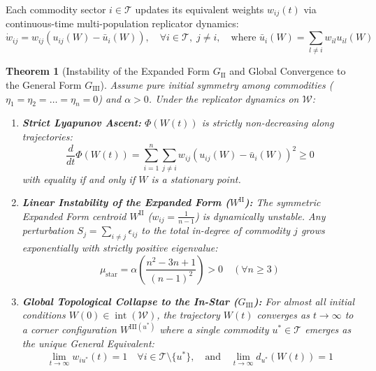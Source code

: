 \documentclass[11pt,a4paper]{article}
\newtheorem{theorem}{Theorem}[section]
\begin{document}
Each commodity sector $i \in \mathcal{T}$ updates its equivalent weights $w_{ij}(t)$ via continuous-time multi-population replicator dynamics:
\begin{equation}
    \dot{w}_{ij} = w_{ij} \left( u_{ij}(W) - \bar{u}_i(W) \right), \quad \forall i \in \mathcal{T}, \; j \neq i, \quad \text{where } \bar{u}_i(W) = \sum_{l \neq i} w_{il} u_{il}(W)
\end{equation}

\begin{theorem}[Instability of the Expanded Form $G_{\text{II}}$ and Global Convergence to the General Form $G_{\text{III}}$]
Assume pure initial symmetry among commodities ($\eta_1 = \eta_2 = \dots = \eta_n = 0$) and $\alpha > 0$. Under the replicator dynamics on $\mathcal{W}$:
\begin{enumerate}[label=(\arabic*)]
    \item \textbf{Strict Lyapunov Ascent:} $\Phi(W(t))$ is strictly non-decreasing along trajectories:
    \begin{equation}
        \frac{d}{dt} \Phi(W(t)) = \sum_{i=1}^n \sum_{j \neq i} w_{ij} \left(u_{ij}(W) - \bar{u}_i(W)\right)^2 \ge 0
    \end{equation}
    with equality if and only if $W$ is a stationary point.
    \item \textbf{Linear Instability of the Expanded Form ($W^{\text{II}}$):} The symmetric Expanded Form centroid $W^{\text{II}}$ ($w_{ij} = \frac{1}{n-1}$) is dynamically unstable. Any perturbation $S_j = \sum_{i \neq j} \epsilon_{ij}$ to the total in-degree of commodity $j$ grows exponentially with strictly positive eigenvalue:
    \begin{equation}
        \mu_{\text{star}} = \alpha \left( \frac{n^2 - 3n + 1}{(n-1)^2} \right) > 0 \quad (\forall n \ge 3)
    \end{equation}
    \item \textbf{Global Topological Collapse to the In-Star ($G_{\text{III}}$):} For almost all initial conditions $W(0) \in \operatorname{int}(\mathcal{W})$, the trajectory $W(t)$ converges as $t \to \infty$ to a corner configuration $W^{\text{III}(u^*)}$ where a single commodity $u^* \in \mathcal{T}$ emerges as the unique General Equivalent:
    \begin{equation}
        \lim_{t \to \infty} w_{i u^*}(t) = 1 \quad \forall i \in \mathcal{T} \setminus \{u^*\}, \quad \text{and} \quad \lim_{t \to \infty} d_{u^*}(W(t)) = 1
    \end{equation}
\end{enumerate}
\end{theorem}
\end{document}
